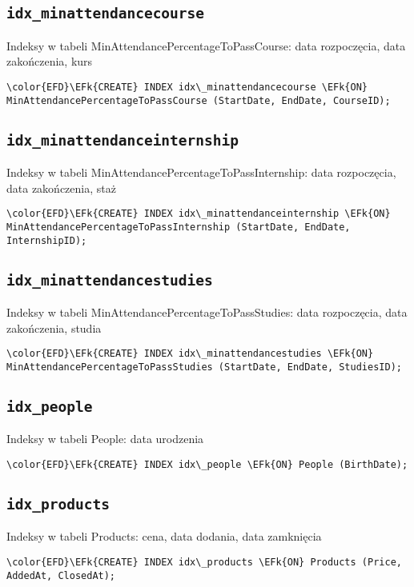 \documentclass[11pt]{article}
\newcommand{\EFk}[1]{\textcolor{EFk}{\textbf{#1}}} %
\begin{document}
\subsection{\texttt{idx\_minattendancecourse}}
\label{sec:org6733a4e}
Indeksy w tabeli MinAttendancePercentageToPassCourse: data rozpoczęcia, data zakończenia, kurs
\begin{Code}
\begin{Verbatim}
\color{EFD}\EFk{CREATE} INDEX idx\_minattendancecourse \EFk{ON} MinAttendancePercentageToPassCourse (StartDate, EndDate, CourseID);
\end{Verbatim}
\end{Code}
\subsection{\texttt{idx\_minattendanceinternship}}
\label{sec:orgef6bef5}
Indeksy w tabeli MinAttendancePercentageToPassInternship: data rozpoczęcia, data zakończenia, staż
\begin{Code}
\begin{Verbatim}
\color{EFD}\EFk{CREATE} INDEX idx\_minattendanceinternship \EFk{ON} MinAttendancePercentageToPassInternship (StartDate, EndDate, InternshipID);
\end{Verbatim}
\end{Code}
\subsection{\texttt{idx\_minattendancestudies}}
\label{sec:org5d82bee}
Indeksy w tabeli MinAttendancePercentageToPassStudies: data rozpoczęcia, data zakończenia, studia
\begin{Code}
\begin{Verbatim}
\color{EFD}\EFk{CREATE} INDEX idx\_minattendancestudies \EFk{ON} MinAttendancePercentageToPassStudies (StartDate, EndDate, StudiesID);
\end{Verbatim}
\end{Code}
\subsection{\texttt{idx\_people}}
\label{sec:orgb11f8af}
Indeksy w tabeli People: data urodzenia
\begin{Code}
\begin{Verbatim}
\color{EFD}\EFk{CREATE} INDEX idx\_people \EFk{ON} People (BirthDate);
\end{Verbatim}
\end{Code}
\subsection{\texttt{idx\_products}}
\label{sec:org98ea044}
Indeksy w tabeli Products: cena, data dodania, data zamknięcia
\begin{Code}
\begin{Verbatim}
\color{EFD}\EFk{CREATE} INDEX idx\_products \EFk{ON} Products (Price, AddedAt, ClosedAt);
\end{Verbatim}
\end{Code}
\end{document}
